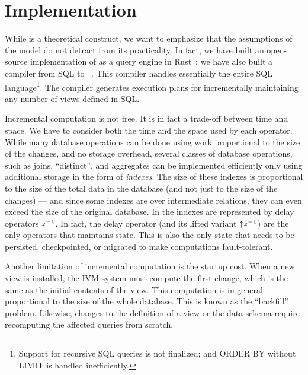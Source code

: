 \section{Implementation}\label{sec:implementation}


While \dbsp is a theoretical construct, we want to emphasize that the
assumptions of the model do not detract from its practicality.  In
fact, we have built an open-source implementation of \dbsp as a query
engine in Rust~\cite{dbsp-crate}; we have also built a compiler from
SQL to \dbsp~\cite{sql-to-dbsp-compiler}.  This compiler handles
essentially the entire SQL language\footnote{Support for recursive SQL
queries is not finalized; and ORDER BY without LIMIT is handled
inefficiently.}.  The compiler generates execution plans for
incrementally maintaining any number of views defined in SQL.

Incremental computation is not free.  It is in fact a trade-off
between time and space.  We have to consider both the time and the
space used by each operator.  While many database operations can be
done using work proportional to the size of the changes, and no
storage overhead, several classes of database operations, such as
joins, ``distinct'', and aggregates can be implemented efficiently
only using additional storage in the form of \emph{indexes}.  The size
of these indexes is proportional to the size of the total data in the
database (and not just to the size of the changes) --- and since some
indexes are over intermediate relations, they can even exceed the size
of the original database.  In \dbsp the indexes are represented by
delay operators $z^{-1}$.  In fact, the delay operator (and its lifted
variant ${\uparrow}z^{-1}$) are the only operators that maintains state.
This is also the only state that needs to be persisted, checkpointed,
or migrated to make \dbsp computations fault-tolerant.

Another limitation of incremental computation is the startup cost.
When a new view is installed, the IVM system must compute the first
change, which is the same as the initial contents of the view.  This
computation is in general proportional to the size of the whole
database.  This is known as the ``backfill'' problem.  Likewise,
changes to the definition of a view or the data schema require
recomputing the affected queries from scratch.

